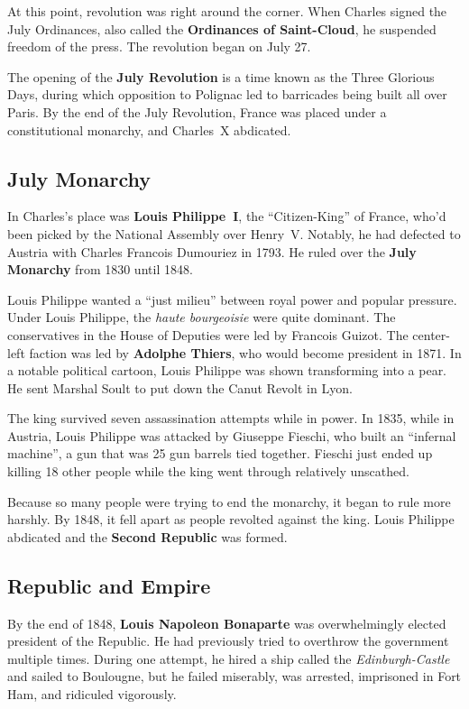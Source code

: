 At this point, revolution was right around the corner.
When Charles signed the July Ordinances, also called the \textbf{Ordinances of Saint-Cloud},
he suspended freedom of the press.
The revolution began on July 27.

The opening of the \textbf{July Revolution} is a time known as the Three Glorious Days,
during which opposition to Polignac led to barricades being built all over Paris.
By the end of the July Revolution,
France was placed under a constitutional monarchy, and Charles~X abdicated.

\subsection*{July Monarchy}

In Charles's place was \textbf{Louis Philippe~I}, the ``Citizen-King'' of France,
who'd been picked by the National Assembly over Henry~V.
Notably, he had defected to Austria with Charles Francois Dumouriez in 1793.
He ruled over the \textbf{July Monarchy} from 1830 until 1848.

Louis Philippe wanted a ``just milieu'' between royal power and popular pressure.
Under Louis Philippe, the \textit{haute bourgeoisie} were quite dominant.
The conservatives in the House of Deputies were led by Francois Guizot.
The center-left faction was led by \textbf{Adolphe Thiers}, who would become president in 1871.
In a notable political cartoon, Louis Philippe was shown transforming into a pear.
He sent Marshal Soult to put down the Canut Revolt in Lyon.

The king survived seven assassination attempts while in power.
In 1835, while in Austria, Louis Philippe was attacked by Giuseppe Fieschi,
who built an ``infernal machine'',
a gun that was 25 gun barrels tied together.
Fieschi just ended up killing 18 other people while the king went through relatively unscathed.

Because so many people were trying to end the monarchy, it began to rule more harshly.
By 1848, it fell apart as people revolted against the king.
Louis Philippe abdicated and the \textbf{Second Republic} was formed.

\subsection*{Republic and Empire}

By the end of 1848,
\textbf{Louis Napoleon Bonaparte} was overwhelmingly elected president of the Republic.
He had previously tried to overthrow the government multiple times.
During one attempt, he hired a ship called the \textit{Edinburgh-Castle} and sailed to Boulougne,
but he failed miserably, was arrested, imprisoned in Fort Ham, and ridiculed vigorously.


